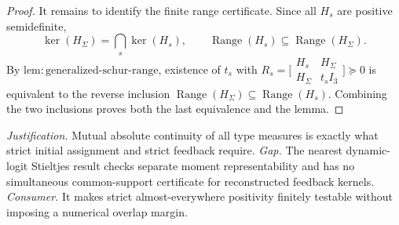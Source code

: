 \documentclass{article}
\begin{document}
\begin{proof}
It remains to identify the finite range certificate.  Since all \(H_s\) are
positive semidefinite,
\[
 \ker(H_\Sigma)=\bigcap_s\ker(H_s),
 \qquad \operatorname{Range}(H_s)\subseteq\operatorname{Range}(H_\Sigma).
\]
By \(\mathrm{lem{:}generalized\text{-}schur\text{-}range}\), existence of
\(t_s\) with
\(R_s=\bigl[\begin{smallmatrix}H_s&H_\Sigma\\H_\Sigma&t_sI_3\end{smallmatrix}\bigr]\succeq0\)
is equivalent to the reverse inclusion
\(\operatorname{Range}(H_\Sigma)\subseteq\operatorname{Range}(H_s)\).
Combining the two inclusions proves both the last equivalence and the lemma.
\end{proof}
\par\smallskip\noindent \textit{Justification.} Mutual absolute continuity of all type measures is exactly what strict initial assignment and strict feedback require. \textit{Gap.} The nearest dynamic-logit Stieltjes result checks separate moment representability and has no simultaneous common-support certificate for reconstructed feedback kernels. \textit{Consumer.} It makes strict almost-everywhere positivity finitely testable without imposing a numerical overlap margin.
\end{document}
